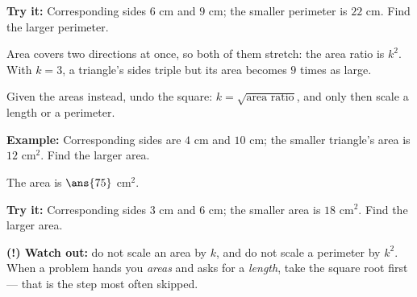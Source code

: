 \documentclass[12pt]{article}
\begin{document}
\begin{tryitbox}
\textbf{Try it:} \quad Corresponding sides $6$ cm and $9$ cm; the smaller
perimeter is $22$ cm. Find the larger perimeter.\\[2pt]
\end{tryitbox}


\begin{formulabox}
Area covers two directions at once, so both of them stretch: the area ratio is
$k^2$. With $k = 3$, a triangle's sides triple but its area becomes $9$ times
as large.\par
Given the areas instead, undo the square: $k = \sqrt{\text{area ratio}}$, and
only then scale a length or a perimeter.
\end{formulabox}

\begin{examplebox}
\textbf{Example:} \quad Corresponding sides are $4$ cm and $10$ cm; the smaller
triangle's area is $12$ cm$^2$. Find the larger area.

The area is $\ans{75}$ cm$^2$.
\end{examplebox}

\begin{tryitbox}
\textbf{Try it:} \quad Corresponding sides $3$ cm and $6$ cm; the smaller area
is $18$ cm$^2$. Find the larger area.\\[2pt]
\end{tryitbox}

\begin{watchoutbox}
\textbf{(!) Watch out:} do not scale an area by $k$, and do not scale a
perimeter by $k^2$. When a problem hands you \emph{areas} and asks for a
\emph{length}, take the square root first --- that is the step most often
skipped.
\end{watchoutbox}
\end{document}
